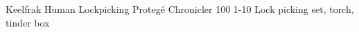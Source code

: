 \begin{filledCS}%
  {Keelfrak}%
  {Human}%
  {Lockpicking Proteg\'e}%
  {Chronicler}%
  {{1}{0}{0}}%
  {{1}{-1}{0}}%
  {%
    \setcounter{Academics}{1}
    \setcounter{Crafts}{2}
    \setcounter{Larceny}{1}
    \setcounter{Melee}{1}
    \longsword
    \partialchain
  }%
  {}%
  {Lock picking set, torch, tinder box}%

\end{filledCS}

\renewcommand\csComments{}

